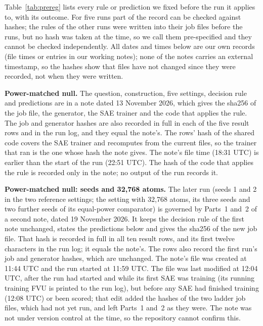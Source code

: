 \documentclass[10pt,twocolumn]{article}
\begin{document}
Table~\ref{tab:prereg} lists every rule or prediction we fixed before the run it applies to, with its outcome. For five runs part of the record can be checked against hashes; the rules of the other runs were written into their job files before the runs, but no hash was taken at the time, so we call them pre-specified and they cannot be checked independently. All dates and times below are our own records (file times or entries in our working notes); none of the notes carries an external timestamp, so the hashes show that files have not changed since they were recorded, not when they were written.

\textbf{Power-matched null.} The question, construction, five settings, decision rule and predictions are in a note dated 13 November 2026, which gives the sha256 of the job file, the generator, the SAE trainer and the code that applies the rule. The job and generator hashes are also recorded in full in each of the five result rows and in the run log, and they equal the note's. The rows' hash of the shared code covers the SAE trainer and recomputes from the current files, so the trainer that ran is the one whose hash the note gives. The note's file time (18:31 UTC) is earlier than the start of the run (22:51 UTC). The hash of the code that applies the rule is recorded only in the note; no output of the run records it.

\textbf{Power-matched null: seeds and 32,768 atoms.} The later run (seeds 1 and 2 in the two reference settings; the setting with 32,768 atoms, its three seeds and two further seeds of its equal-power comparator) is governed by Parts~1 and~2 of a second note, dated 19 November 2026. It keeps the decision rule of the first note unchanged, states the predictions below and gives the sha256 of the new job file. That hash is recorded in full in all ten result rows, and its first twelve characters in the run log; it equals the note's. The rows also record the first run's job and generator hashes, which are unchanged. The note's file was created at 11:44 UTC and the run started at 11:59 UTC. The file was last modified at 12:04 UTC, after the run had started and while its first SAE was training (its running training FVU is printed to the run log), but before any SAE had finished training (12:08 UTC) or been scored; that edit added the hashes of the two ladder job files, which had not yet run, and left Parts~1 and~2 as they were. The note was not under version control at the time, so the repository cannot confirm this.
\end{document}
